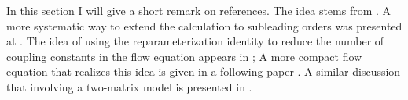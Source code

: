 In this section I will give a short remark on references.
The idea stems from .
A more systematic way to extend the calculation to subleading orders was presented at .
The idea of using the reparameterization identity to reduce the number of coupling constants in the flow equation appears in ;
A more compact flow equation that realizes this idea is given in a following paper .
A similar discussion that involving a two-matrix model is presented in .
